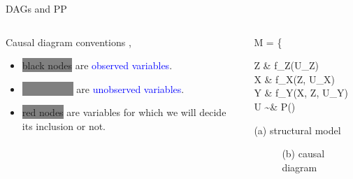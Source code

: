 %
%
\begin{frame}
	{DAGs and PP}
	\begin{columns}
		\begin{column}{0.5\textwidth}
			Causal diagram conventions \cite{Cinelli_et_al_2021},
			\begin{itemize}
				\item \colorbox{gray}{black nodes} are \textcolor{blue}{observed variables}.
				\item \colorbox{grey}{\textcolor{gray}{white nodes}} are \textcolor{blue}{unobserved variables}.
				\item \colorbox{gray}{\alert{red nodes}} are variables for which we will decide its inclusion or not.
			\end{itemize}
		\end{column}
		\begin{column}{0.5\textwidth}  
			\begin{equ}
				M = \left\{ \begin{aligned} 
					Z \leftarrow & \; f_{Z}(U_{Z}) \\
					X \leftarrow & \; f_{X}(Z, U_{X}) \\
					Y \leftarrow & \; f_{Y}(X, Z, U_{Y}) \\
					U \sim & \; P()
				\end{aligned} \right
				\caption*{(a) structural model}
			\end{equ}
			\begin{figure}
				\caption*{(b) causal diagram }
			\end{figure}
		\end{column}
	\end{columns}
\end{frame}
